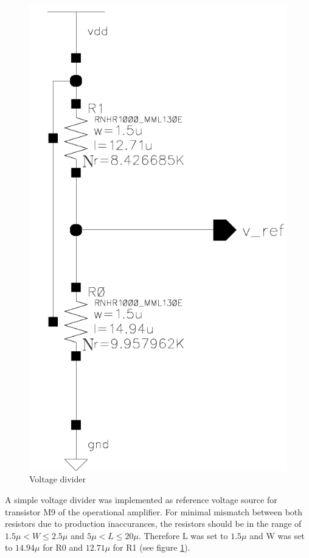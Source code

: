 \documentclass[parskip,oneside,colorbacktitle,10pt,accentcolor=tud1b]{tudreport}
\begin{document}
{\begin{figure}
	\centering
    \includegraphics[scale=0.4]{v_ref_schem}
    \caption{Voltage divider}
    \label{fig:vrefschem}
\end{figure}

A simple voltage divider was implemented as reference voltage source for transistor M9 of the operational amplifier. For minimal mismatch between both resistors due to production inaccurances, the resistors should be in the range of $1.5\mu < W \leq 2.5\mu$ and $5\mu < L \leq 20\mu$. Therefore L was set to $1.5\mu$ and W was set to $14.94\mu$ for R0 and $12.71\mu$ for R1 (see figure \ref{fig:vrefschem}).

}
\end{document}
